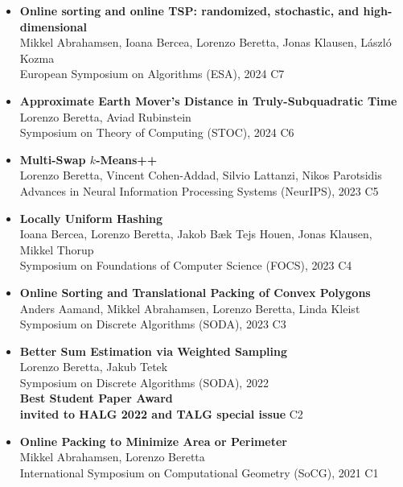 \documentclass[paper=a4,fontsize=11pt]{article} %
\begin{document}
\begin{itemize}[leftmargin=0.5em,itemsep=0.3em]
\item \textbf{Online sorting and online TSP: randomized, stochastic, and high-dimensional}\\ 
Mikkel Abrahamsen, Ioana Bercea, Lorenzo Beretta, Jonas Klausen, László Kozma \\
European Symposium on Algorithms (ESA), 2024 \hfill C7

\item \textbf{Approximate Earth Mover's Distance in Truly-Subquadratic Time} \\ 
Lorenzo Beretta, Aviad Rubinstein \\
Symposium on Theory of Computing (STOC), 2024 \hfill C6

\item \textbf{Multi-Swap $k$-Means++} \\
Lorenzo Beretta, Vincent Cohen-Addad, Silvio Lattanzi, Nikos Parotsidis \\
Advances in Neural Information Processing Systems (NeurIPS), 2023 \hfill C5

\item \textbf{Locally Uniform Hashing} \\
Ioana Bercea, Lorenzo Beretta, Jakob Bæk Tejs Houen, Jonas Klausen, Mikkel Thorup \\
Symposium on Foundations of Computer Science (FOCS), 2023 \hfill C4

\item \textbf{Online Sorting and Translational Packing of Convex Polygons} \\
Anders Aamand, Mikkel Abrahamsen, Lorenzo Beretta, Linda Kleist \\
Symposium on Discrete Algorithms (SODA), 2023 \hfill C3

\item \textbf{Better Sum Estimation via Weighted Sampling} \\
Lorenzo Beretta, Jakub Tetek \\ 
Symposium on Discrete Algorithms (SODA), 2022 \\
\textbf{Best Student Paper Award \\
invited to HALG 2022 and TALG special issue} \hfill C2

\item \textbf{Online Packing to Minimize Area or Perimeter} \\
Mikkel Abrahamsen, Lorenzo Beretta \\
International Symposium on Computational Geometry (SoCG), 2021 \hfill C1
\end{itemize}
\end{document}
